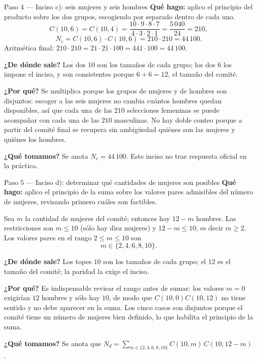 \documentclass[11pt]{article}
\begin{document}
\begin{paso}{Paso 4 --- Inciso c): seis mujeres y seis hombres}
\textbf{Qué hago:} aplico el principio del producto sobre los dos grupos, escogiendo por separado dentro de cada uno.
\[
  C(10,6)=C(10,4)=\frac{10\cdot 9\cdot 8\cdot 7}{4\cdot 3\cdot 2\cdot 1}=\frac{5\,040}{24}=210 ,
\]
\[
  N_c=C(10,6)\cdot C(10,6)=210\cdot 210=44\,100 .
\]
Aritmética final: $210\cdot 210 = 21\cdot 21\cdot 100 = 441\cdot 100 = 44\,100$.

\textbf{¿De dónde sale?} Los dos $10$ son los tamaños de cada grupo; los dos $6$ los impone el inciso, y son consistentes porque $6+6=12$, el tamaño del comité.

\textbf{¿Por qué?} Se multiplica porque los grupos de mujeres y de hombres son disjuntos: escoger a las seis mujeres no cambia cuántos hombres quedan disponibles, así que cada una de las $210$ selecciones femeninas se puede acompañar con cada una de las $210$ masculinas. No hay doble conteo porque a partir del comité final se recupera sin ambigüedad quiénes son las mujeres y quiénes los hombres.

\textbf{¿Qué tomamos?} Se anota $N_c=44\,100$. Este inciso no trae respuesta oficial en la práctica.
\end{paso}

\begin{paso}{Paso 5 --- Inciso d): determinar qué cantidades de mujeres son posibles}
\textbf{Qué hago:} aplico el principio de la suma sobre los valores pares admisibles del número de mujeres, revisando primero cuáles son factibles.

Sea $m$ la cantidad de mujeres del comité; entonces hay $12-m$ hombres. Las restricciones son $m\le 10$ (sólo hay diez mujeres) y $12-m\le 10$, es decir $m\ge 2$. Los valores pares en el rango $2\le m\le 10$ son
\[
  m\in\{2,4,6,8,10\}.
\]

\textbf{¿De dónde sale?} Los topes $10$ son los tamaños de cada grupo; el $12$ es el tamaño del comité; la paridad la exige el inciso.

\textbf{¿Por qué?} Es indispensable revisar el rango antes de sumar: los valores $m=0$ exigirían $12$ hombres y sólo hay $10$, de modo que $C(10,0)C(10,12)$ no tiene sentido y no debe aparecer en la suma. Los cinco casos son disjuntos porque el comité tiene un número de mujeres bien definido, lo que habilita el principio de la suma.

\textbf{¿Qué tomamos?} Se anota que $N_d=\sum_{m\in\{2,4,6,8,10\}} C(10,m)\,C(10,12-m)$.
\end{paso}
\end{document}
